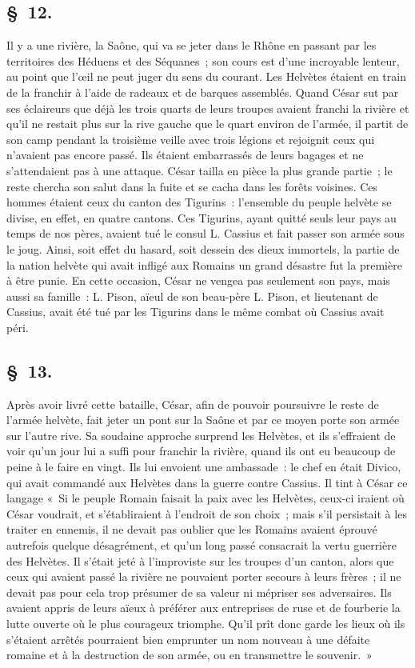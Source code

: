 \documentclass[french,twoside]{book} %
\begin{document}
\subsection[{§ 12.}]{ \textsc{§ 12.} }
\noindent Il y a une rivière, la Saône, qui va se jeter dans le Rhône en passant par les territoires des Héduens et des Séquanes ; son cours est d’une incroyable lenteur, au point que l’œil ne peut juger du sens du courant. Les Helvètes étaient en train de la franchir à l’aide de radeaux et de barques assemblés. Quand César sut par ses éclaireurs que déjà les trois quarts de leurs troupes avaient franchi la rivière et qu’il ne restait plus sur la rive gauche que le quart environ de l’armée, il partit de son camp pendant la troisième veille avec trois légions et rejoignit ceux qui n’avaient pas encore passé. Ils étaient embarrassés de leurs bagages et ne s’attendaient pas à une attaque. César tailla en pièce la plus grande partie ; le reste chercha son salut dans la fuite et se cacha dans les forêts voisines. Ces hommes étaient ceux du canton des Tigurins : l’ensemble du peuple helvète se divise, en effet, en quatre cantons. Ces Tigurins, ayant quitté seuls leur pays au temps de nos pères, avaient tué le consul L. Cassius et fait passer son armée sous le joug. Ainsi, soit effet du hasard, soit dessein des dieux immortels, la partie de la nation helvète qui avait infligé aux Romains un grand désastre fut la première à être punie. En cette occasion, César ne vengea pas seulement son pays, mais aussi sa famille : L. Pison, aïeul de son beau-père L. Pison, et lieutenant de Cassius, avait été tué par les Tigurins dans le même combat où Cassius avait péri.
\subsection[{§ 13.}]{ \textsc{§ 13.} }
\noindent Après avoir livré cette bataille, César, afin de pouvoir poursuivre le reste de l’armée helvète, fait jeter un pont sur la Saône et par ce moyen porte son armée sur l’autre rive. Sa soudaine approche surprend les Helvètes, et ils s’effraient de voir qu’un jour lui a suffi pour franchir la rivière, quand ils ont eu beaucoup de peine à le faire en vingt. Ils lui envoient une ambassade : le chef en était Divico, qui avait commandé aux Helvètes dans la guerre contre Cassius. Il tint à César ce langage « Si le peuple Romain faisait la paix avec les Helvètes, ceux-ci iraient où César voudrait, et s’établiraient à l’endroit de son choix ; mais s’il persistait à les traiter en ennemis, il ne devait pas oublier que les Romains avaient éprouvé autrefois quelque désagrément, et qu’un long passé consacrait la vertu guerrière des Helvètes. Il s’était jeté à l’improviste sur les troupes d’un canton, alors que ceux qui avaient passé la rivière ne pouvaient porter secours à leurs frères ; il ne devait pas pour cela trop présumer de sa valeur ni mépriser ses adversaires. Ils avaient appris de leurs aïeux à préférer aux entreprises de ruse et de fourberie la lutte ouverte où le plus courageux triomphe. Qu'il prît donc garde les lieux où ils s’étaient arrêtés pourraient bien emprunter un nom nouveau à une défaite romaine et à la destruction de son armée, ou en transmettre le souvenir. »
\end{document}
